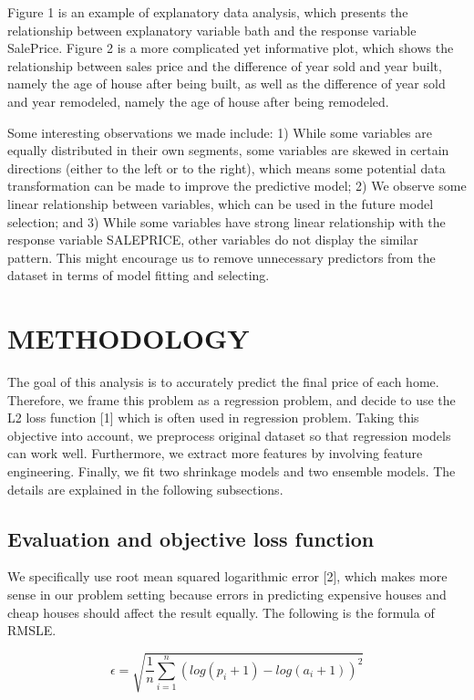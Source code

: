 \documentclass[letterpaper, 10 pt, conference]{ieeeconf}\usepackage[]{graphicx}\usepackage[]{color}
\begin{document}
Figure 1 is an example of explanatory data analysis, which presents the relationship between explanatory variable bath and the response variable SalePrice. Figure 2 is a more complicated yet informative plot, which shows the relationship between sales price and the difference of year sold and year built, namely the age of house after being built, as well as the difference of year sold and year remodeled, namely the age of house after being remodeled.

Some interesting observations we made include: 1) While some variables are equally distributed in their own segments, some variables are skewed in certain directions (either to the left or to the right), which means some potential data transformation can be made to improve the predictive model; 2) We observe some linear relationship between variables, which can be used in the future model selection; and 3) While some variables have strong linear relationship with the response variable SALEPRICE, other variables do not display the similar pattern. This might encourage us to remove unnecessary predictors from the dataset in terms of model fitting and selecting.

\section{METHODOLOGY}

The goal of this analysis is to accurately predict the final price of each home. Therefore, we frame this problem as a regression problem, and decide to use the L2 loss function [1] which is often used in regression problem. Taking this objective into account, we preprocess original dataset so that regression models can work well. Furthermore, we extract more features by involving feature engineering. Finally, we fit two shrinkage models and two ensemble models. The details are explained in the following subsections.

\subsection{Evaluation and objective loss function}

We specifically use root mean squared logarithmic error [2], which makes more sense in our problem setting because errors in predicting expensive houses and cheap houses should affect the result equally. The following is the formula of RMSLE.

$$
\epsilon = \sqrt{\frac{1}{n} \sum_{i=1}^{n} (log(p_{i} + 1) - log(a_{i} + 1))^2}
$$
\end{document}
